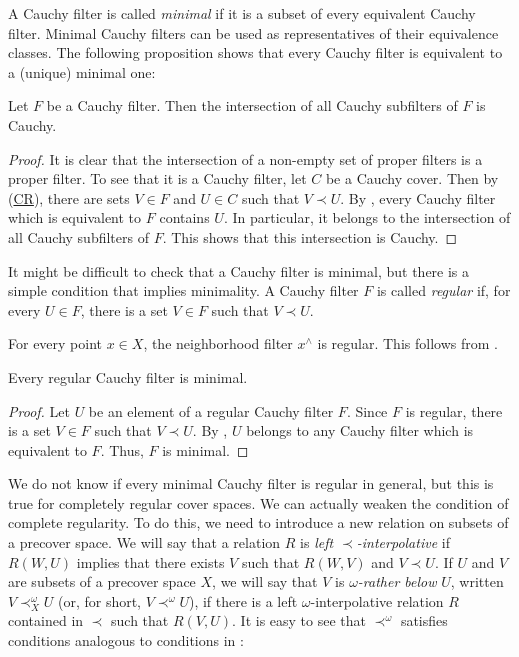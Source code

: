 \documentclass[reqno]{amsart}
\newcommand{\axref}[1]{(\hyperref[ax:#1]{#1})}
\theoremstyle{definition}
\theoremstyle{remark}
\numberwithin{figure}{section}
\newcommand{\rb}{\prec}
\begin{document}
A Cauchy filter is called \emph{minimal} if it is a subset of every equivalent Cauchy filter.
Minimal Cauchy filters can be used as representatives of their equivalence classes.
The following proposition shows that every Cauchy filter is equivalent to a (unique) minimal one:

\begin{prop}
Let $F$ be a Cauchy filter.
Then the intersection of all Cauchy subfilters of $F$ is Cauchy.
\end{prop}
\begin{proof}
It is clear that the intersection of a non-empty set of proper filters is a proper filter.
To see that it is a Cauchy filter, let $C$ be a Cauchy cover.
Then by \axref{CR}, there are sets $V \in F$ and $U \in C$ such that $V \rb U$.
By , every Cauchy filter which is equivalent to $F$ contains $U$.
In particular, it belongs to the intersection of all Cauchy subfilters of $F$.
This shows that this intersection is Cauchy.
\end{proof}

It might be difficult to check that a Cauchy filter is minimal, but there is a simple condition that implies minimality.
A Cauchy filter $F$ is called \emph{regular} if, for every $U \in F$, there is a set $V \in F$ such that $V \rb U$.

\begin{example}
For every point $x \in X$, the neighborhood filter $x^\wedge$ is regular.
This follows from .
\end{example}

\begin{prop}
Every regular Cauchy filter is minimal.
\end{prop}
\begin{proof}
Let $U$ be an element of a regular Cauchy filter $F$.
Since $F$ is regular, there is a set $V \in F$ such that $V \rb U$.
By , $U$ belongs to any Cauchy filter which is equivalent to $F$.
Thus, $F$ is minimal.
\end{proof}

We do not know if every minimal Cauchy filter is regular in general, but this is true for completely regular cover spaces.
We can actually weaken the condition of complete regularity.
To do this, we need to introduce a new relation on subsets of a precover space.
We will say that a relation $R$ is \emph{left $\rb$-interpolative} if $R(W,U)$ implies that there exists $V$ such that $R(W,V)$ and $V \rb U$.
If $U$ and $V$ are subsets of a precover space $X$, we will say that $V$ is \emph{$\omega$-rather below} $U$, written $V \rb^\omega_X U$ (or, for short, $V \rb^\omega U$), if there is a left $\omega$-interpolative relation $R$ contained in $\rb$ such that $R(V,U)$.
It is easy to see that $\rb^\omega$ satisfies conditions analogous to conditions in :
\end{document}
